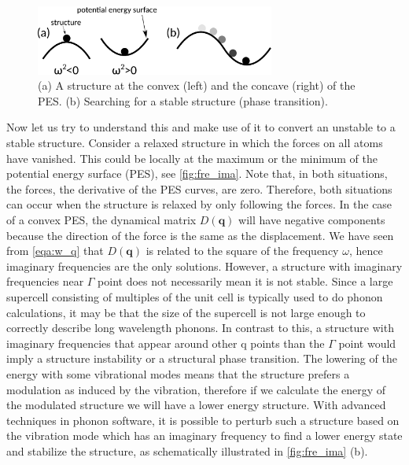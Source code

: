 \begin{figure}[htb] 
\centering  
\includegraphics[width=0.7\textwidth]{fre_ima.eps}
\caption{ (a) A structure at the convex (left) and the concave (right) of the PES. (b) Searching for a stable structure (phase transition).}  
\label{fig:fre_ima}
\end{figure} 

Now let us try to understand this and make use of it to convert an unstable to a stable structure. Consider a relaxed structure in which the forces on all atoms have vanished. This could be locally at the maximum or the minimum of the potential energy surface (PES), see \autoref{fig:fre_ima}. Note that, in both situations, the forces, the derivative of the PES curves, are zero. Therefore, both situations can occur when the structure is relaxed by only following the forces. In the case of a convex PES, the dynamical matrix $D(\mathbf{q})$ will have negative components because the direction of the force is the same as the displacement. We have seen from \autoref{eqa:w_q} that $D(\mathbf{q})$ is related to the square of the frequency $\omega$, hence imaginary frequencies are the only solutions. However, a structure with imaginary frequencies near $\Gamma$ point does not necessarily mean it is not stable. Since a large supercell consisting of multiples of the unit cell is typically used to do phonon calculations, it may be that the size of the supercell is not large enough to correctly describe long wavelength phonons. In contrast to this, a structure with imaginary frequencies that appear around other q points than the $\Gamma$ point would imply a structure instability or a structural phase transition. The lowering of the energy with some vibrational modes means that the structure prefers a modulation as induced by the vibration, therefore if we calculate the energy of the modulated structure we will have a lower energy structure. With advanced techniques in phonon software\cite[e.g.][]{phonopya}, it is possible to perturb such a structure based on the vibration mode which has an imaginary frequency to find a lower energy state and stabilize the structure, as schematically illustrated in \autoref{fig:fre_ima} (b). 



